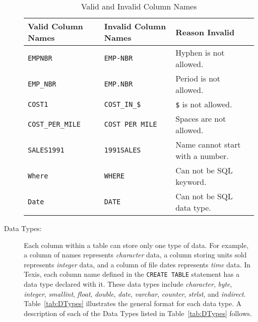 \begin{description}
\begin{table}
\caption{Valid and Invalid Column Names}{\label{tab:Names}}
\begin{center}
\begin{tabular}{|l|l|l|} \hline
Valid Column Names & Invalid Column Names & Reason Invalid \\ \hline\hline
\verb`EMPNBR`        & \verb`EMP-NBR`       & Hyphen is not allowed.           \\
\verb`EMP_NBR`       & \verb`EMP.NBR`       & Period is not allowed.           \\
\verb`COST1`         & \verb`COST_IN_$`     & \verb`$` is not allowed.               \\
\verb`COST_PER_MILE` & \verb`COST PER MILE` & Spaces are not allowed.          \\
\verb`SALES1991`     & \verb`1991SALES`     & Name cannot start with a number. \\
\verb`Where`         & \verb`WHERE`         & Can not be SQL keyword.          \\
\verb`Date`          & \verb`DATE`          & Can not be SQL data type.        \\ \hline
\end{tabular}
\end{center}
\end{table}

\item[Data Types:] Each column within a table can store only one type
of data.  For example, a column of names represents {\em character}
data, a column storing units sold represents {\em integer} data, and a
column of file dates represents {\em time} data.  In Texis, each
column name defined in the {\tt CREATE TABLE} statement has a data type
declared with it.  These data types include {\em character}, {\em
byte}, {\em integer}, {\em smallint}, {\em float}, {\em double},
{\em date}, {\em varchar}, {\em counter}, {\em strlst}, and {\em indirect}.
Table~\ref{tab:DTypes} illustrates the general format for each data
type.  A description of each of the Data Types listed in
Table~\ref{tab:DTypes} follows.


\end{description}
